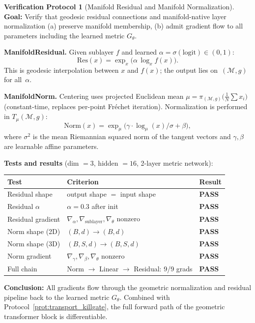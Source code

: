 \documentclass[11pt,a4paper]{article}
\theoremstyle{definition}
\newtheorem{protocol}[theorem]{Verification Protocol}
\theoremstyle{remark}
\newcommand{\Mman}{(\mathcal{M}, g)}
\begin{document}
\begin{protocol}[Manifold Residual and Manifold Normalization]%
\label{prot:residual_norm}
\textbf{Goal:} Verify that geodesic residual connections and 
manifold-native layer normalization (a) preserve manifold 
membership, (b) admit gradient flow to all parameters including 
the learned metric $G_\theta$.

\textbf{ManifoldResidual.} Given sublayer $f$ and learned 
$\alpha = \sigma(\text{logit})\in(0,1)$:
\[
  \mathrm{Res}(x) = \exp_x\!\bigl(\alpha\, \log_x f(x)\bigr).
\]
This is geodesic interpolation between $x$ and $f(x)$; the 
output lies on~$\Mman$ for all~$\alpha$.

\textbf{ManifoldNorm.} Centering uses projected Euclidean mean 
$\mu = \pi_{\Mman}\!\bigl(\tfrac{1}{N}\sum x_i\bigr)$ 
(constant-time, replaces per-point Fr\'echet iteration). 
Normalization is performed in $T_\mu\Mman$:
\[
  \mathrm{Norm}(x) = \exp_\mu\!\bigl(\gamma\cdot \log_\mu(x)/\sigma + \beta\bigr),
\]
where $\sigma^2$ is the mean Riemannian squared norm of the 
tangent vectors and $\gamma,\beta$ are learnable affine parameters.

\textbf{Tests and results} (dim $= 3$, hidden $= 16$, 2-layer 
metric network):
\begin{center}
\begin{tabular}{lll}
\toprule
Test & Criterion & Result \\
\midrule
Residual shape & output shape $=$ input shape & \textbf{PASS} \\
Residual $\alpha$ & $\alpha = 0.3$ after init & \textbf{PASS} \\
Residual gradient & $\nabla_{\alpha}, \nabla_{\text{sublayer}}, \nabla_{\theta}$ nonzero & \textbf{PASS} \\
Norm shape (2D) & $(B,d) \to (B,d)$ & \textbf{PASS} \\
Norm shape (3D) & $(B,S,d) \to (B,S,d)$ & \textbf{PASS} \\
Norm gradient & $\nabla_\gamma, \nabla_\beta, \nabla_\theta$ nonzero & \textbf{PASS} \\
Full chain & Norm $\to$ Linear $\to$ Residual: 9/9 grads & \textbf{PASS} \\
\bottomrule
\end{tabular}
\end{center}
\textbf{Conclusion:} All gradients flow through the geometric 
normalization and residual pipeline back to the learned metric 
$G_\theta$. Combined with Protocol~\ref{prot:transport_killgate}, 
the full forward path of the geometric transformer block is 
differentiable.
\end{protocol}
\end{document}
